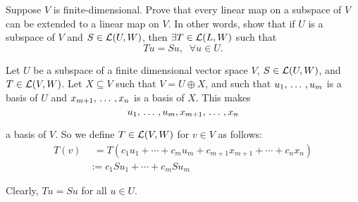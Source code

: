 \begin{xrcs}
  Suppose $V$ is finite-dimensional. Prove that every linear map on a subspace of $V$ can be extended to a linear map on $V$. In other words, show that if $U$ is a subspace of $V$ and $S \in \mathcal{L} (U,W)$, then $\exists T \in \mathcal{L}(L, W)$ such that
  \begin{equation}
    T u = S u, \; \; \forall u \in U.
  \end{equation}

  \begin{xprf}
    Let  $U$ be a subspace of a finite dimensional vector space $V$, $S \in \mathcal{L}(U,W)$, and $T \in \mathcal{L}(V,W)$. Let $X \subseteq V$ such that $V = U \oplus X$, and such that $u_1, {\, \ldots \,\,}, u_m$ is a basis of $U$ and $x_{m+1}, {\, \ldots \,\,}, x_n$ is a basis of $X$. This makes
    \begin{equation}
      u_1, {\, \ldots \,\,}, u_m, x_{m+1}, {\, \ldots \,\,}, x_{n}
    \end{equation}

    a basis of $V$. So we define $T \in \mathcal{L}(V,W)$ for $v \in V$ as follows:
    \begin{equation}
      \begin{aligned}
        T(v)  &\phantom{:}= T(c_1 u_1 + \cdots + c_m u_m + c_{m+1} x_{m+1} + \cdots + c_n x_n) \\
              &:=           c_1 S u_1 + \cdots + c_m S u_m
      \end{aligned}
    \end{equation}

    Clearly, $T u = S u$ for all $u \in U$.
  \end{xprf}
\end{xrcs}
